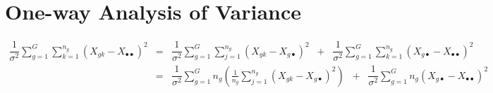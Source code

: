 \section{One-way Analysis of Variance}
\setcounter{theorem}{0}

\begin{proposition}
\begin{eqnarray*}
\dfrac{1}{\sigma^{2}}\sum_{g=1}^{G}\sum_{k=1}^{n_{g}}\left(X_{gk} - X_{\bullet\bullet}\right)^{2}
& = &
\dfrac{1}{\sigma^{2}}\sum_{g=1}^{G}\sum_{j=1}^{n_{g}}\left(X_{gk}-X_{g\bullet}\right)^{2}
\;\; + \;\;
\dfrac{1}{\sigma^{2}}\sum_{g=1}^{G} \sum_{k=1}^{n_{g}} \left(X_{g\bullet} - X_{\bullet\bullet}\right)^{2} \\
& = &
\dfrac{1}{\sigma^{2}}\sum_{g=1}^{G}n_{g}\left(\frac{1}{n_{g}}\sum_{j=1}^{n_{g}}\left(X_{gk}-X_{g\bullet}\right)^{2}\right)
\;\; + \;\;
\dfrac{1}{\sigma^{2}}\sum_{g=1}^{G} n_{g}\left(X_{g\bullet} - X_{\bullet\bullet}\right)^{2}
\end{eqnarray*}
\end{proposition}

